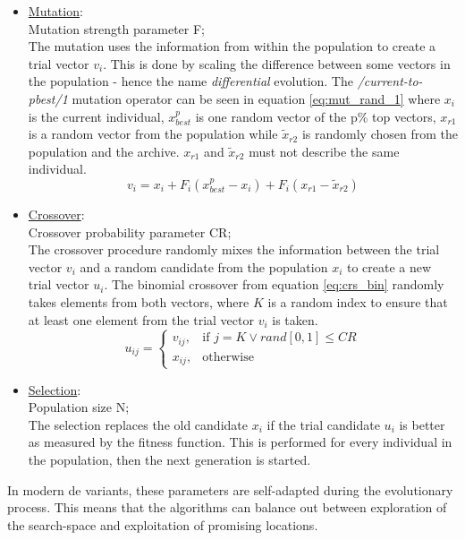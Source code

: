 \documentclass[./\jobname.tex]{subfiles}
\begin{document}
\begin{itemize}
	\item \underline{Mutation}: \\
		  Mutation strength parameter F;\\
		  The mutation uses the information from within the population to create a trial vector $v_i$. This is done by scaling the difference between some vectors in the population - hence the name \textit{differential} evolution. The \textit{/current-to-pbest/1} mutation operator can be seen in equation \eqref{eq:mut_rand_1} where $x_i$ is the current individual, $x_{best}^p$ is one random vector of the p\% top vectors, $x_{r1}$ is a random vector from the population while $\tilde{x}_{r2}$ is randomly chosen from the population and the archive. $x_{r1}$ and $\tilde{x}_{r2}$ must not describe the same individual.
		  \begin{equation}
		  \label{eq:mut_rand_1}
		  v_i = x_{i} + F_i(x_{best}^p - x_{i}) + F_i(x_{r1} - \tilde{x}_{r2})
		  \end{equation}
	\item \underline{Crossover}: \\
		  Crossover probability parameter CR;\\
		  The crossover procedure randomly mixes the information between the trial vector $v_i$ and a random candidate from the population $x_{i}$ to create a new trial vector $u_i$. The binomial crossover from equation \eqref{eq:crs_bin} randomly takes elements from both vectors, where $K$ is a random index to ensure that at least one element from the trial vector $v_i$ is taken.
		  \begin{equation}
		  \label{eq:crs_bin}
		  u_{ij}=\begin{cases}
		  v_{ij}, &\text{if $j = K \lor rand[0,1] \leq CR$}\\
		  x_{ij}, &\text{otherwise}
		  \end{cases}
		  \end{equation}
	\item \underline{Selection}: \\
		  Population size N;\\
		  The selection replaces the old candidate $x_i$ if the trial candidate $u_i$ is better as measured by the fitness function. This is performed for every individual in the population, then the next generation is started.
\end{itemize}  

In modern \gls{de} variants, these parameters are self-adapted during the evolutionary process. This means that the algorithms can balance out between exploration of the search-space and exploitation of promising locations. 
\end{document}
